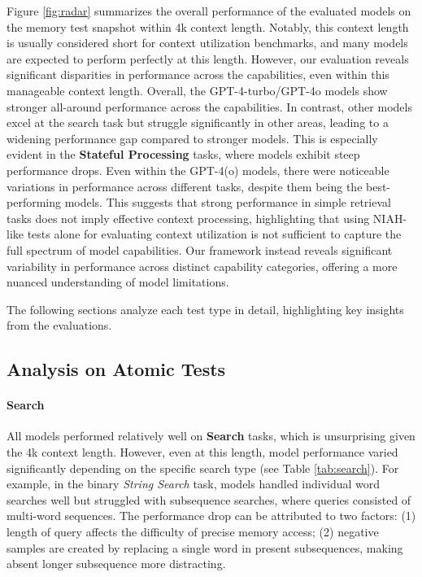 Figure \ref {fig:radar} summarizes the overall performance of the evaluated models on the memory test snapshot within 4k context length. Notably, this context length is usually considered short for context utilization benchmarks, and many models are expected to perform perfectly at this length. However, our evaluation reveals significant disparities in performance across the capabilities, even within this manageable context length. Overall, the GPT-4-turbo/GPT-4o models show stronger all-around performance across the capabilities. In contrast, other models excel at the search task but struggle significantly in other areas, leading to a widening performance gap compared to stronger models. This is especially evident in the \textbf{Stateful Processing} tasks, where models exhibit steep performance drops. Even within the GPT-4(o) models, there were noticeable variations in performance across different tasks, despite them being the best-performing models. This suggests that strong performance in simple retrieval tasks does not imply effective context processing, highlighting that using NIAH-like tests alone for evaluating context utilization is not sufficient to capture the full spectrum of model capabilities. Our framework instead reveals significant variability in performance across distinct capability categories, offering a more nuanced understanding of model limitations.

The following sections analyze each test type in detail, highlighting key insights from the evaluations.


\subsection{Analysis on Atomic Tests}


\paragraph{Search} All models performed relatively well on \textbf{Search} tasks, which is unsurprising given the 4k context length. However, even at this length, model performance varied significantly depending on the specific search type (see Table \ref{tab:search}). For example, in the binary \textit{String Search} task, models handled individual word searches well but struggled with subsequence searches, where queries consisted of multi-word sequences. The performance drop can be attributed to two factors: (1) length of query affects the difficulty of precise memory access; (2) negative samples are created by replacing a single word in present subsequences, making absent longer subsequence more distracting.


